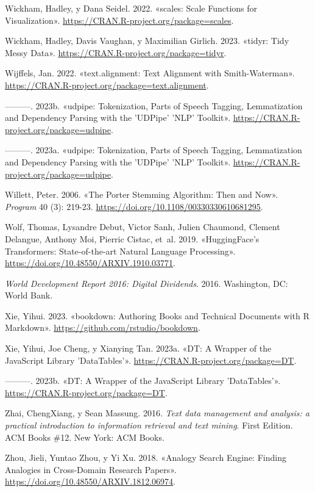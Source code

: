 \documentclass[
  12pt,
  openany]{book}
\newlength{\cslhangindent}
\newlength{\cslentryspacingunit} %
\newenvironment{CSLReferences}[2] %
 {%
  \setlength{\parindent}{0pt}
  \ifodd #1
  \let\oldpar\par
  \def\par{\hangindent=\cslhangindent\oldpar}
  \fi
  \setlength{\parskip}{#2\cslentryspacingunit}
 }%
 {}
\begin{document}
\begin{CSLReferences}{1}{0}
\leavevmode{}%
Wickham, Hadley, y Dana Seidel. 2022. {«scales: Scale Functions for Visualization»}. \url{https://CRAN.R-project.org/package=scales}.

\leavevmode{}%
Wickham, Hadley, Davis Vaughan, y Maximilian Girlich. 2023. {«tidyr: Tidy Messy Data»}. \url{https://CRAN.R-project.org/package=tidyr}.

\leavevmode{}%
Wijffels, Jan. 2022. {«text.alignment: Text Alignment with Smith-Waterman»}. \url{https://CRAN.R-project.org/package=text.alignment}.

\leavevmode{}%
---------. 2023b. {«udpipe: Tokenization, Parts of Speech Tagging, Lemmatization and Dependency Parsing with the 'UDPipe' 'NLP' Toolkit»}. \url{https://CRAN.R-project.org/package=udpipe}.

\leavevmode{}%
---------. 2023a. {«udpipe: Tokenization, Parts of Speech Tagging, Lemmatization and Dependency Parsing with the 'UDPipe' 'NLP' Toolkit»}. \url{https://CRAN.R-project.org/package=udpipe}.

\leavevmode{}%
Willett, Peter. 2006. {«The Porter Stemming Algorithm: Then and Now»}. \emph{Program} 40 (3): 219-23. \url{https://doi.org/10.1108/00330330610681295}.

\leavevmode{}%
Wolf, Thomas, Lysandre Debut, Victor Sanh, Julien Chaumond, Clement Delangue, Anthony Moi, Pierric Cistac, et~al. 2019. {«HuggingFace's Transformers: State-of-the-art Natural Language Processing»}. \url{https://doi.org/10.48550/ARXIV.1910.03771}.

\leavevmode{}%
\emph{World Development Report 2016: Digital Dividends}. 2016. Washington, DC: World Bank.

\leavevmode{}%
Xie, Yihui. 2023. {«bookdown: Authoring Books and Technical Documents with R Markdown»}. \url{https://github.com/rstudio/bookdown}.

\leavevmode{}%
Xie, Yihui, Joe Cheng, y Xianying Tan. 2023a. {«DT: A Wrapper of the JavaScript Library 'DataTables'»}. \url{https://CRAN.R-project.org/package=DT}.

\leavevmode{}%
---------. 2023b. {«DT: A Wrapper of the JavaScript Library 'DataTables'»}. \url{https://CRAN.R-project.org/package=DT}.

\leavevmode{}%
Zhai, ChengXiang, y Sean Massung. 2016. \emph{Text data management and analysis: a practical introduction to information retrieval and text mining}. First Edition. ACM Books {\#}12. New York: ACM Books.

\leavevmode{}%
Zhou, Jieli, Yuntao Zhou, y Yi Xu. 2018. {«Analogy Search Engine: Finding Analogies in Cross-Domain Research Papers»}. \url{https://doi.org/10.48550/ARXIV.1812.06974}.

\end{CSLReferences}
\end{document}
